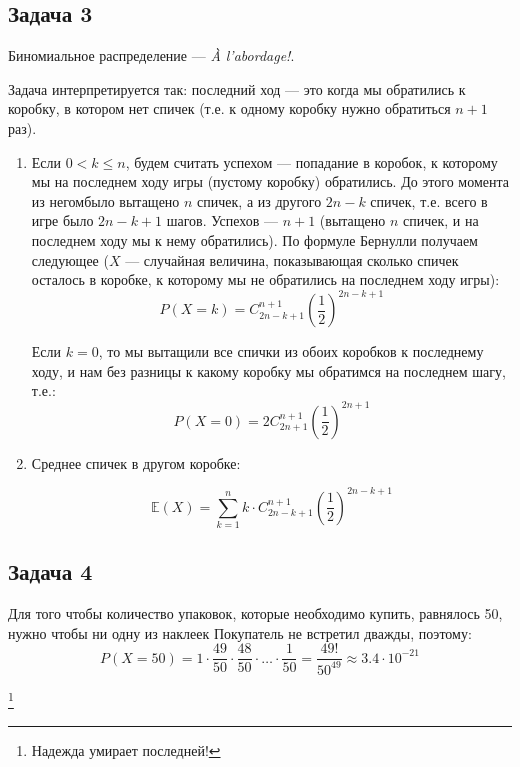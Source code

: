 \documentclass[a4paper,12pt]{article}
\theoremstyle{plain}                         %
\theoremstyle{definition}                  %
\theoremstyle{remark}                      %
\begin{document}
\subsection*{Задача 3}

Биномиальное распределение --- \textit{À l’abordage!}.

Задача интерпретируется так: последний ход --- это когда мы обратились к коробку, в котором нет спичек (т.е. к одному коробку нужно обратиться $n+1$ раз). 

\begin{enumerate}
\item Если $0<k \leqslant n$, будем считать успехом --- попадание в коробок, к которому мы на последнем ходу игры (пустому коробку) обратились. До этого момента из негомбыло вытащено $n$ спичек, а из другого $2n-k$ спичек, т.е. всего в игре было $2n - k + 1$ шагов. Успехов --- $n + 1$ (вытащено $n$ спичек, и на последнем ходу мы к нему обратились). По формуле Бернулли получаем следующее ($X$ --- случайная величина, показывающая сколько спичек осталось в коробке, к которому мы не обратились на последнем ходу игры):
$$P(X = k) = C^{n+1}_{2n-k+1} \left(\dfrac{1}{2} \right)^{2n-k+1}$$

Если $k = 0$, то мы вытащили все спички из обоих коробков к последнему ходу, и нам без разницы к какому коробку мы обратимся на последнем шагу, т.е.:
$$P(X = 0) =2 C^{n+1}_{2n+1} \left(\dfrac{1}{2} \right)^{2n+1}$$

\item Среднее спичек в другом коробке:

$$\mathbb{E}(X) = \sum \limits_{k=1}^{n} k \cdot C^{n+1}_{2n-k+1} \left(\dfrac{1}{2} \right)^{2n-k+1}$$


\end{enumerate}







\subsection*{Задача 4}

Для того чтобы количество упаковок, которые необходимо купить, равнялось 50, нужно чтобы ни одну из наклеек Покупатель не встретил дважды, поэтому:
$$
P(X=50) = 1\cdot\frac{49}{50}\cdot\frac{48}{50}\cdot\dots\cdot\frac{1}{50} = \frac{49!}{50^{49}} \approx 3.4\cdot
10^{-21}$$ \vspace{-1cm}

\hspace{10.5cm}\footnote[2]{Надежда умирает последней!}
\end{document}
